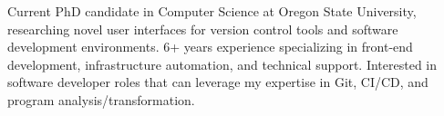 

\begin{cvparagraph}

Current PhD candidate in Computer Science at Oregon State University, researching novel user interfaces for version control tools and software development environments. 6+ years experience specializing in front-end development, infrastructure automation, and technical support.  Interested in software developer roles that can leverage my expertise in Git, CI/CD, and program analysis/transformation.

\end{cvparagraph}
